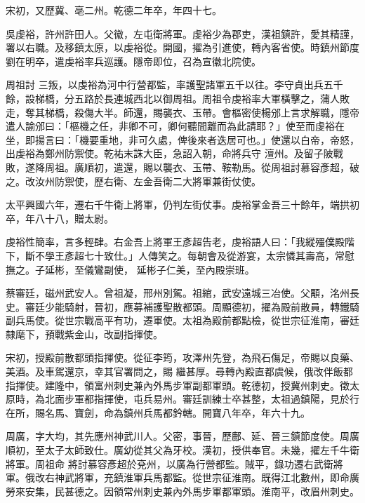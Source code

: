 \begin{pinyinscope}
 宋初，又歷冀、亳二州。乾德二年卒，年四十七。



 吳虔裕，許州許田人。父徽，左屯衛將軍。虔裕少為郡吏，漢祖鎮許，愛其精謹，署以右職。及移鎮太原，以虔裕從。開國，擢為引進使，轉內客省使。時鎮州節度劉在明卒，遣虔裕率兵巡護。隱帝即位，召為宣徽北院使。



 周祖討
 三叛，以虔裕為河中行營都監，率護聖諸軍五千以往。李守貞出兵五千餘，設梯橋，分五路於長連城西北以御周祖。周祖令虔裕率大軍橫擊之，蒲人敗走，奪其梯橋，殺傷大半。師還，賜襲衣、玉帶。會樞密使楊邠上言求解職，隱帝遣人諭邠曰：「樞機之任，非卿不可，卿何聽間離而為此請耶？」使至而虔裕在坐，即揚言曰：「機要重地，非可久處，俾後來者迭居可也。」使還以白帝，帝怒，出虔裕為鄭州防禦使。乾祐末誅大臣，急詔入朝，命將兵守
 澶州。及留子陂戰敗，遂降周祖。廣順初，遣還，賜以襲衣、玉帶、鞍勒馬。從周祖討慕容彥超，破之。改汝州防禦使，歷右衛、左金吾衛二大將軍兼街仗使。



 太平興國六年，遷右千牛衛上將軍，仍判左街仗事。虔裕掌金吾三十餘年，端拱初卒，年八十八，贈太尉。



 虔裕性簡率，言多輕肆。右金吾上將軍王彥超告老，虔裕語人曰：「我縱殭僕殿階下，斷不學王彥超七十致仕。」人傳笑之。每朝會及從游宴，太宗憐其壽高，常慰撫之。子延彬，至儀鸞副使，
 延彬子仁美，至內殿崇班。



 蔡審廷，磁州武安人。曾祖凝，邢州別駕。祖綰，武安遠城三冶使。父顒，洺州長史。審廷少能騎射，晉初，應募補護聖散都頭。周顯德初，擢為殿前散員，轉鐵騎副兵馬使。從世宗戰高平有功，遷軍使。太祖為殿前都點檢，從世宗征淮南，審廷隸麾下，預戰紫金山，改副指揮使。



 宋初，授殿前散都頭指揮使。從征李筠，攻澤州先登，為飛石傷足，帝賜以良藥、美酒。及車駕還京，幸其官署問之，賜
 繼甚厚。尋轉內殿直都虞候，俄改伴飯都指揮使。建隆中，領富州刺史兼內外馬步軍副都軍頭。乾德初，授冀州刺史。徵太原時，為北面步軍都指揮使，屯兵易州。審廷訓練士卒甚整，太祖過鎮陽，見於行在所，賜名馬、寶劍，命為鎮州兵馬都鈐轄。開寶八年卒，年六十九。



 周廣，字大均，其先應州神武川人。父密，事晉，歷鄜、延、晉三鎮節度使。周廣順初，至太子太師致仕。廣幼從其父為牙校。漢初，授供奉官。未幾，擢左千牛衛將軍。周祖命
 將討慕容彥超於兗州，以廣為行營都監。賊平，錄功遷右武衛將軍。俄改右神武將軍，充鎮淮軍兵馬都監。從世宗征淮南。既得江北數州，即命廣勞來安集，民甚德之。因領常州刺史兼內外馬步軍都軍頭。淮南平，改眉州刺史。




\end{pinyinscope}
